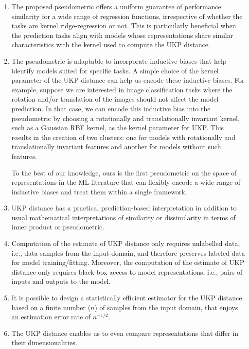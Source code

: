 \documentclass{article} %
\newcommand{\metricstname}{UKP }
\theoremstyle{plain}
\begin{document}
\begin{enumerate}
    \item The proposed pseudometric offers a uniform guarantee of performance similarity for a wide range of regression functions, irrespective of whether the tasks are kernel ridge-regression or not. This is particularly beneficial when the prediction tasks align with models whose representations share similar characteristics with the kernel used to compute the \metricstname distance.

     \item The pseudometric is adaptable to incorporate inductive biases that help identify models suited for specific tasks. A simple choice of the kernel parameter of the \metricstname distance can help us encode these inductive biases. For example, suppose we are interested in image classification tasks where the rotation and/or translation of the images should not affect the model prediction. In that case, we can encode this inductive bias into the pseudometric by choosing a rotationally and translationally invariant kernel, such as a Gaussian RBF kernel, as the kernel parameter for UKP. This results in the creation of two clusters: one for models with rotationally and translationally invariant features and another for models without such features.
    
    To the best of our knowledge, ours is the first pseudometric on the space of representations in the ML literature that can flexibly encode a wide range of inductive biases and treat them within a single framework.

    \item \metricstname distance has a practical prediction-based interpretation in addition to usual mathematical interpretations of similarity or dissimilarity in terms of inner product or pseudometric.
    
    \item Computation of the estimate of \metricstname distance only requires unlabelled data, i.e., data samples from the input domain, and therefore preserves labeled data for model training/fitting. Moreover, the computation of the estimate of \metricstname distance only requires black-box access to model representations, i.e., pairs of inputs and outputs to the model. 
    \item It is possible to design a statistically efficient estimator for the \metricstname distance based on a finite number ($n$) of samples from the input domain, that enjoys an estimation error rate of $n^{-1/2}$.
    
    \item The \metricstname distance enables us to even compare representations that differ in their dimensionalities. 
    
\end{enumerate}
\end{document}
